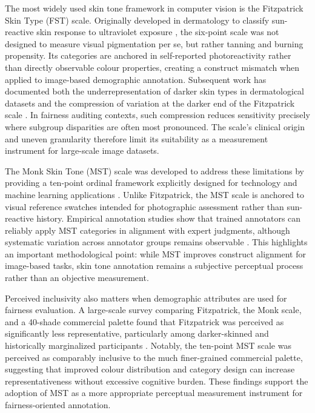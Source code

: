 The most widely used skin tone framework in computer vision is the Fitzpatrick Skin Type (FST) scale. Originally developed in dermatology to classify sun-reactive skin response to ultraviolet exposure \cite{Fitzpatrick_1988_SkinTypes}, the six-point scale was not designed to measure visual pigmentation per se, but rather tanning and burning propensity. Its categories are anchored in self-reported photoreactivity rather than directly observable colour properties, creating a construct mismatch when applied to image-based demographic annotation. Subsequent work has documented both the underrepresentation of darker skin types in dermatological datasets and the compression of variation at the darker end of the Fitzpatrick scale \cite{Groh_2021_Fitzpatrick17k}. In fairness auditing contexts, such compression reduces sensitivity precisely where subgroup disparities are often most pronounced. The scale’s clinical origin and uneven granularity therefore limit its suitability as a measurement instrument for large-scale image datasets.

The Monk Skin Tone (MST) scale was developed to address these limitations by providing a ten-point ordinal framework explicitly designed for technology and machine learning applications \cite{Schumann_2024_MonkSkinTone}. Unlike Fitzpatrick, the MST scale is anchored to visual reference swatches intended for photographic assessment rather than sun-reactive history. Empirical annotation studies show that trained annotators can reliably apply MST categories in alignment with expert judgments, although systematic variation across annotator groups remains observable \cite{Schumann_2024_MonkSkinTone}. This highlights an important methodological point: while MST improves construct alignment for image-based tasks, skin tone annotation remains a subjective perceptual process rather than an objective measurement.

Perceived inclusivity also matters when demographic attributes are used for fairness evaluation. A large-scale survey comparing Fitzpatrick, the Monk scale, and a 40-shade commercial palette found that Fitzpatrick was perceived as significantly less representative, particularly among darker-skinned and historically marginalized participants \cite{Heldreth_2024_WhichSkinToneMeasures}. Notably, the ten-point MST scale was perceived as comparably inclusive to the much finer-grained commercial palette, suggesting that improved colour distribution and category design can increase representativeness without excessive cognitive burden. These findings support the adoption of MST as a more appropriate perceptual measurement instrument for fairness-oriented annotation.

